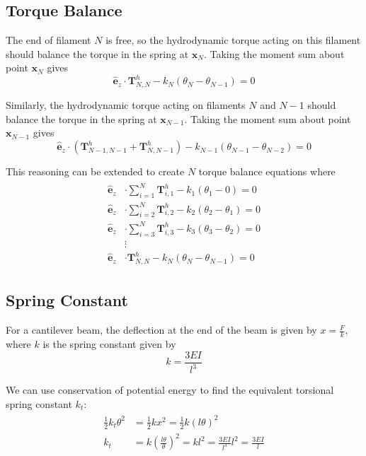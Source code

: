 \documentclass[12pt,letterpaper,titlepage]{article}
\newcommand{\uvec}[1]{\mathbf{\hat{#1}}}
\begin{document}
\subsection{Torque Balance}
The end of filament $N$ is free, so the hydrodynamic torque acting on this filament should balance the torque in the spring at $\mathbf{x}_N$. Taking the moment sum about point $\mathbf{x}_N$ gives
\begin{equation}
\uvec{e}_z  \cdot \mathbf{T}_{N,N}^h - k_N(\theta_N - \theta_{N-1}) = 0
\end{equation}

Similarly, the hydrodynamic torque acting on filaments $N$ and $N-1$ should balance the torque in the spring at $\mathbf{x}_{N-1}$. Taking the moment sum about point $\mathbf{x}_{N-1}$ gives
\begin{equation}
\uvec{e}_z \cdot (\mathbf{T}_{N-1,N-1}^h + \mathbf{T}_{N,N-1}^h) - k_{N-1}(\theta_{N-1} - \theta_{N-2}) = 0
\end{equation}

This reasoning can be extended to create $N$ torque balance equations where
\begin{align}
\begin{split}
\uvec{e}_z &\cdot \sum_{i=1}^{N} \mathbf{T}_{i,1}^h - k_1(\theta_1 - 0) = 0 \\
\uvec{e}_z &\cdot \sum_{i=2}^{N} \mathbf{T}_{i,2}^h - k_2(\theta_2 - \theta_1) = 0 \\
\uvec{e}_z &\cdot \sum_{i=3}^{N} \mathbf{T}_{i,3}^h - k_3(\theta_3 - \theta_2) = 0 \\
&\vdots \\
\uvec{e}_z &\cdot \mathbf{T}_{N,N}^h - k_N(\theta_N - \theta_{N-1}) = 0
\end{split}
\end{align}

\newpage

\subsection{Spring Constant}
For a cantilever beam, the deflection at the end of the beam is given by $x = \frac{F}{k}$, where $k$ is the spring constant given by
\begin{equation}
k = \frac{3EI}{l^3}
\end{equation}

We can use conservation of potential energy to find the equivalent torsional spring constant $k_t$:
\begin{align}
\begin{split}
\frac{1}{2} k_t \theta^2 &= \frac{1}{2} k x^2 = \frac{1}{2} k (l \theta)^2 \\
k_t &= k (\frac{l \theta}{\theta})^2 = k l^2 = \frac{3EI}{l^3} l^2 = \frac{3EI}{l}\\
\end{split}
\end{align}
\end{document}

